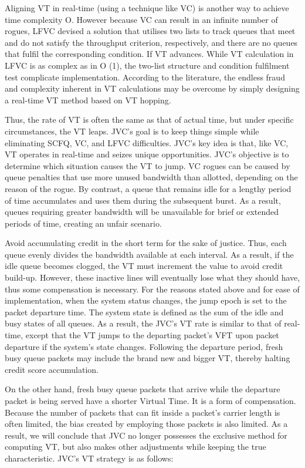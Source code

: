 Aligning VT in real-time (using a technique like VC) is another way to achieve time complexity O. However because VC can result in an infinite number of rogues, LFVC devised a solution that utilises two lists to track queues that meet and do not satisfy the throughput criterion, respectively, and there are no queues that fulfil the corresponding condition. If VT advances. While VT calculation in LFVC is as complex as in O (1), the two-list structure and condition fulfilment test complicate implementation. According to the literature, the endless fraud and complexity inherent in VT calculations may be overcome by simply designing a real-time VT method based on VT hopping. 

Thus, the rate of VT is often the same as that of actual time, but under specific circumstances, the VT leaps. JVC's goal is to keep things simple while eliminating SCFQ, VC, and LFVC difficulties. JVC's key idea is that, like VC, VT operates in real-time and seizes unique opportunities. JVC's objective is to determine which situation causes the VT to jump. VC rogues can be caused by queue penalties that use more unused bandwidth than allotted, depending on the reason of the rogue. By contrast, a queue that remains idle for a lengthy period of time accumulates and uses them during the subsequent burst. As a result, queues requiring greater bandwidth will be unavailable for brief or extended periods of time, creating an unfair scenario. 

Avoid accumulating credit in the short term for the sake of justice. Thus, each queue evenly divides the bandwidth available at each interval. As a result, if the idle queue becomes clogged, the VT must increment the value to avoid credit build-up. However, these inactive lines will eventually lose what they should have, thus some compensation is necessary. For the reasons stated above and for ease of implementation, when the system status changes, the jump epoch is set to the packet departure time. The system state is defined as the sum of the idle and busy states of all queues. As a result, the JVC's VT rate is similar to that of real-time, except that the VT jumps to the departing packet's VFT upon packet departure if the system's state changes. Following the departure period, fresh busy queue packets may include the brand new and bigger VT, thereby halting credit score accumulation. 

On the other hand, fresh busy queue packets that arrive while the departure packet is being served have a shorter Virtual Time. It is a form of compensation. Because the number of packets that can fit inside a packet's carrier length is often limited, the bias created by employing those packets is also limited. As a result, we will conclude that JVC no longer possesses the exclusive method for computing VT, but also makes other adjustments while keeping the true characteristic. JVC's VT strategy is as follows:


